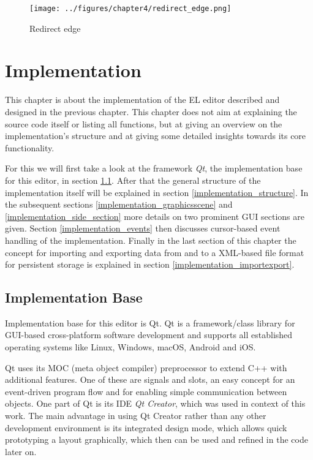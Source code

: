 \documentclass[twoside, openright, 12pt]{book}
\begin{document}
\begin{figure}[htb]
	\centering
	\texttt{[image: ../figures/chapter4/redirect\_edge.png]}
	\caption{Redirect edge}
	\label{fig:redirect_edge}
\end{figure}





\cleardoublepage
\chapter{Implementation}
\label{implementation}
This chapter is about the implementation of the EL editor described and designed in the previous chapter.
This chapter does not aim at explaining the source code itself or listing all functions, but at giving an overview on the implementation's structure and at giving some detailed insights towards its core functionality.

For this we will first take a look at the framework \textit{Qt}, the implementation base for this editor, in section \ref{implementation_base}.
After that the general structure of the implementation itself will be explained in section \ref{implementation_structure}.
In the subsequent sections \ref{implementation_graphicsscene} and \ref{implementation_side_section} more details on two prominent GUI sections are given.
Section \ref{implementation_events} then discusses cursor-based event handling of the implementation.
Finally in the last section of this chapter the concept for importing and exporting data from and to a XML-based file format for persistent storage is explained in section \ref{implementation_importexport}.



\section{Implementation Base}
\label{implementation_base}
Implementation base for this editor is Qt.
Qt is a framework/class library for GUI-based cross-platform software development and supports all established operating systems like Linux, Windows, macOS, Android and iOS.

Qt uses its MOC (meta object compiler) preprocessor to extend C++ with additional features.
One of these are signals and slots, an easy concept for an event-driven program flow and for enabling simple communication between objects.
One part of Qt is its IDE \textit{Qt Creator}, which was used in context of this work.
The main advantage in using Qt Creator rather than any other development environment is its integrated design mode, which allows quick prototyping a layout graphically, which then can be used and refined in the code later on.
\end{document}
